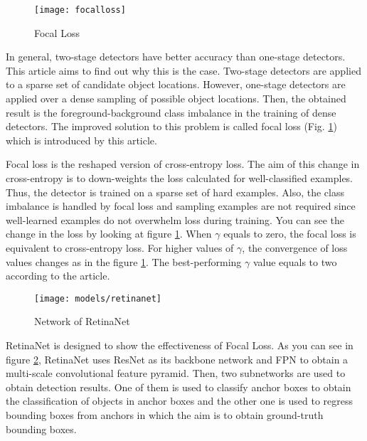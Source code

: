 \documentclass{article}
\begin{document}
\setlength{\parindent}{6ex}

\begin{figure}
    \centering
    \texttt{[image: focalloss]}
    \caption{Focal Loss \cite{flretnetcite}}
    \label{fig:focalloss1}
\end{figure}

\indent

In general, two-stage detectors have better accuracy than one-stage 
detectors. This article aims to find out why this is the case. 
Two-stage detectors are applied to a sparse set of candidate object 
locations. However, one-stage detectors are applied over a dense sampling 
of possible object locations. Then, the obtained result is the 
foreground-background class imbalance in the training of dense detectors.
The improved solution to this problem is called focal loss (Fig. 
\ref{fig:focalloss1}) which is introduced by this article. \par

Focal loss \cite{flretnetcite} is the reshaped version of cross-entropy loss. The aim of 
this change in cross-entropy is to down-weights the loss calculated for 
well-classified examples. Thus, the detector is trained on a sparse set of 
hard examples. Also, the class imbalance is handled by focal loss and 
sampling examples are not required since well-learned examples do not 
overwhelm loss during training. You can see the change in the loss by looking at 
figure \ref{fig:focalloss1}. When $\gamma$ equals to zero, the focal loss is 
equivalent to cross-entropy loss. For higher values of $\gamma$, the 
convergence of loss values changes as in the figure \ref{fig:focalloss1}. 
The best-performing $\gamma$ value equals to two according to the article.

\begin{figure}
    \centering
    \texttt{[image: models/retinanet]}
    \caption{Network of RetinaNet \cite{flretnetcite}}
    \label{fig:retinanet1}
\end{figure}
\indent

RetinaNet \cite{flretnetcite} is designed to show the effectiveness of Focal Loss. As you 
can see in figure \ref{fig:retinanet1}, RetinaNet uses ResNet as its 
backbone network and FPN to obtain a multi-scale convolutional feature 
pyramid. Then, two subnetworks are used to obtain detection results. 
One of them is used to classify anchor boxes to obtain the classification of 
objects in anchor boxes and the other one is used to regress bounding 
boxes from anchors in which the aim is to obtain ground-truth bounding 
boxes.
\end{document}
